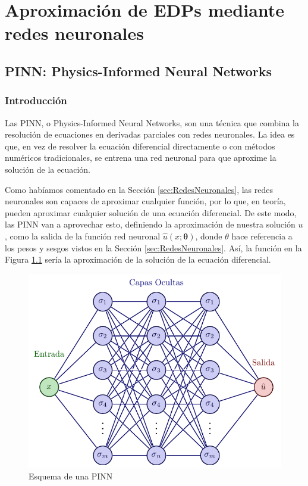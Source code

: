 \documentclass[a4paper,11pt,spanish, twoside, leqno]{tfg-uam}
\theoremstyle{definition}
\begin{document}
\chapter{Aproximación de EDPs mediante redes neuronales}\label{chap2}

\section{PINN: Physics-Informed Neural Networks}\label{sec:PINN}
\subsection{Introducción}
Las PINN, o Physics-Informed Neural Networks, son una técnica que combina la resolución de ecuaciones en derivadas parciales con redes neuronales. La idea es que, en vez de resolver la ecuación diferencial directamente o con métodos numéricos tradicionales, se entrena una red neuronal para que aproxime la solución de la ecuación. 

Como habíamos comentado en la Sección \ref{sec:RedesNeuronales}, las redes neuronales son capaces de aproximar cualquier función, por lo que, en teoría, pueden aproximar cualquier solución de una ecuación diferencial. De este modo, las PINN van a aprovechar esto, definiendo la aproximación de nuestra solución ${u}$, como la salida de la función red neuronal $\hat{u}(x;\mathbf{\theta})$,  donde $\theta$ hace referencia a los pesos y sesgos vistos en la Sección \ref{sec:RedesNeuronales}. Así, la función en la Figura \ref{fig:PIN} sería la aproximación de la solución de la ecuación diferencial.
\begin{figure}[htbp]
    \centering
    \includegraphics[scale=0.6]{Figuras/neural_network_improved.pdf}
    \caption{Esquema de una PINN}
    \label{fig:PIN}
\end{figure}
\end{document}
